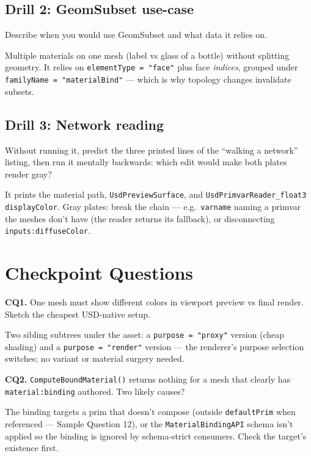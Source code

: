 \subsection*{Drill 2: GeomSubset use-case}
Describe when you would use GeomSubset and what data it relies on.
\begin{DrillSolution}
Multiple materials on one mesh (label vs glass of a bottle) without
splitting geometry. It relies on \texttt{elementType = "face"} plus face
\emph{indices}, grouped under \texttt{familyName = "materialBind"} --- which
is why topology changes invalidate subsets.
\end{DrillSolution}

\subsection*{Drill 3: Network reading}
Without running it, predict the three printed lines of the
``walking a network'' listing, then run it mentally backwards: which edit
would make both plates render gray?
\begin{DrillSolution}
It prints the material path, \texttt{UsdPreviewSurface}, and
\texttt{UsdPrimvarReader\_float3 displayColor}. Gray plates: break the chain
--- e.g.\ \texttt{varname} naming a primvar the meshes don't have (the
reader returns its fallback), or disconnecting
\texttt{inputs:diffuseColor}.
\end{DrillSolution}

\section*{Checkpoint Questions}

\noindent\textbf{CQ1.} One mesh must show different colors in viewport
preview vs final render. Sketch the cheapest USD-native setup.
\begin{DrillSolution}
Two sibling subtrees under the asset: a \texttt{purpose = "proxy"} version
(cheap shading) and a \texttt{purpose = "render"} version --- the renderer's
purpose selection switches; no variant or material surgery needed.
\end{DrillSolution}

\noindent\textbf{CQ2.} \texttt{ComputeBoundMaterial()} returns nothing for a
mesh that clearly has \texttt{material:binding} authored. Two likely causes?
\begin{DrillSolution}
The binding targets a prim that doesn't compose (outside
\texttt{defaultPrim} when referenced --- Sample Question 12), or the
\texttt{MaterialBindingAPI} schema isn't applied so the binding is ignored
by schema-strict consumers. Check the target's existence first.
\end{DrillSolution}


